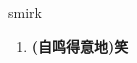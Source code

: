 
\begin{frame}
{\huge smirk}
\begin{center}
\begin{enumerate}\Large
  \item \textbf{(自鸣得意地)笑}
\end{enumerate}
\end{center}
\end{frame}
